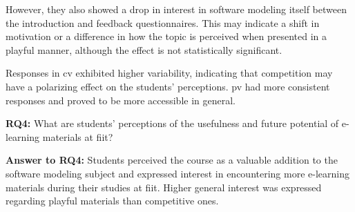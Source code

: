 However, they also showed a drop in interest in software modeling itself between the introduction and feedback questionnaires. This may indicate a shift in motivation or a difference in how the topic is perceived when presented in a playful manner, although the effect is not statistically significant.

Responses in \ac{cv} exhibited higher variability, indicating that competition may have a polarizing effect on the students' perceptions. \ac{pv} had more consistent responses and proved to be more accessible in general. 

\textbf{RQ4:} What are students’ perceptions of the usefulness and future potential of e-learning materials at \ac{fiit}?

\textbf{Answer to RQ4:} Students perceived the course as a valuable addition to the software modeling subject and expressed interest in encountering more e-learning materials during their studies at \ac{fiit}. Higher general interest was expressed regarding playful materials than competitive ones.
